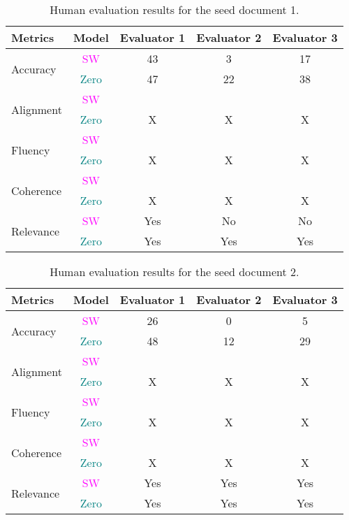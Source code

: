 \begin{table*}[h!]
\small 
\centering
\begin{tabular}{@{}p{2cm}c|c|c|c@{}}
\toprule
\textbf{Metrics} & \textbf{Model} & \textbf{Evaluator 1} & \textbf{Evaluator 2} & \textbf{Evaluator 3} \\ \midrule
 \multirow{2}{*}{Accuracy} &  \textcolor{magenta}{SW} & 43 & 3 & 17\\
\cmidrule(r){2-5}
& {\textcolor{teal}{Zero}} & 47 & 22 & 38\\
\midrule
\multirow{2}{*}{Alignment} &  \textcolor{magenta}{SW} &  &  \\
\cmidrule(r){2-5}
& {\textcolor{teal}{Zero}} & X & X & X\\
\midrule
\multirow{2}{*}{Fluency} &  \textcolor{magenta}{SW} &  &  &\\
\cmidrule(r){2-5}
& {\textcolor{teal}{Zero}} & X & X & X\\
\midrule
\multirow{2}{*}{Coherence} &  \textcolor{magenta}{SW} &  &  &\\
\cmidrule(r){2-5}
& {\textcolor{teal}{Zero}} & X & X & X\\
\midrule
\multirow{2}{*}{Relevance} &  \textcolor{magenta}{SW} & Yes & No & No\\
\cmidrule(r){2-5}
& {\textcolor{teal}{Zero}} & Yes & Yes & Yes\\
\bottomrule
\end{tabular}
\caption{Human evaluation results for the seed document 1.}
\label{table:human-eval-seed1}
\end{table*}

\begin{table*}[h!]
\small 
\centering
\begin{tabular}{@{}p{2cm}c|c|c|c@{}}
\toprule
\textbf{Metrics} & \textbf{Model} & \textbf{Evaluator 1} & \textbf{Evaluator 2} & \textbf{Evaluator 3} \\ \midrule
 \multirow{2}{*}{Accuracy} &  \textcolor{magenta}{SW} & 26 & 0 & 5\\
\cmidrule(r){2-5}
& {\textcolor{teal}{Zero}} & 48 & 12 & 29\\
\midrule
\multirow{2}{*}{Alignment} &  \textcolor{magenta}{SW} &  &  \\
\cmidrule(r){2-5}
& {\textcolor{teal}{Zero}} & X & X & X\\
\midrule
\multirow{2}{*}{Fluency} &  \textcolor{magenta}{SW} &  &  &\\
\cmidrule(r){2-5}
& {\textcolor{teal}{Zero}} & X & X & X\\
\midrule
\multirow{2}{*}{Coherence} &  \textcolor{magenta}{SW} &  &  &\\
\cmidrule(r){2-5}
& {\textcolor{teal}{Zero}} & X & X & X\\
\midrule
\multirow{2}{*}{Relevance} &   \textcolor{magenta}{SW} & Yes & Yes & Yes\\
\cmidrule(r){2-5}
& {\textcolor{teal}{Zero}} & Yes & Yes & Yes\\
\bottomrule
\end{tabular}
\caption{Human evaluation results for the seed document 2.}
\label{table:human-eval-seed2}
\end{table*}

